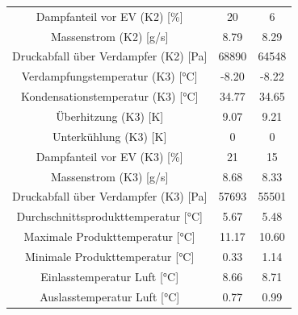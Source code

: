 \begin{table}[h!]
\begin{tabular}{|ccc|}
\multicolumn{1}{|c|}{Dampfanteil vor EV (K2) {[}\%{]}}          & \multicolumn{1}{c|}{20}    & 6            \\
\multicolumn{1}{|c|}{Massenstrom (K2) {[}g/s{]}}                & \multicolumn{1}{c|}{8.79}  & 8.29         \\
\multicolumn{1}{|c|}{Druckabfall über Verdampfer (K2) {[}Pa{]}} & \multicolumn{1}{c|}{68890} & 64548        \\ \hline
\multicolumn{1}{|c|}{Verdampfungstemperatur (K3) {[}°C{]}}      & \multicolumn{1}{c|}{-8.20} & -8.22        \\
\multicolumn{1}{|c|}{Kondensationstemperatur (K3) {[}°C{]}}    & \multicolumn{1}{c|}{34.77} & 34.65        \\
\multicolumn{1}{|c|}{Überhitzung (K3) {[}K{]}}                  & \multicolumn{1}{c|}{9.07}  & 9.21         \\
\multicolumn{1}{|c|}{Unterkühlung (K3) {[}K{]}}                 & \multicolumn{1}{c|}{0}     & 0            \\
\multicolumn{1}{|c|}{Dampfanteil vor EV (K3) {[}\%{]}}          & \multicolumn{1}{c|}{21}    & 15           \\
\multicolumn{1}{|c|}{Massenstrom (K3) {[}g/s{]}}                & \multicolumn{1}{c|}{8.68}  & 8.33         \\
\multicolumn{1}{|c|}{Druckabfall über Verdampfer (K3) {[}Pa{]}} & \multicolumn{1}{c|}{57693} & 55501        \\ \hline
\multicolumn{1}{|c|}{Durchschnittsprodukttemperatur {[}°C{]}}   & \multicolumn{1}{c|}{5.67}  & 5.48         \\
\multicolumn{1}{|c|}{Maximale Produkttemperatur {[}°C{]}}       & \multicolumn{1}{c|}{11.17} & 10.60        \\
\multicolumn{1}{|c|}{Minimale Produkttemperatur {[}°C{]}}       & \multicolumn{1}{c|}{0.33}  & 1.14         \\
\multicolumn{1}{|c|}{Einlasstemperatur Luft {[}°C{]}}           & \multicolumn{1}{c|}{8.66}  & 8.71         \\
\multicolumn{1}{|c|}{Auslasstemperatur Luft {[}°C{]}}           & \multicolumn{1}{c|}{0.77}  & 0.99         \\ \hline
\end{tabular}
\end{table}

